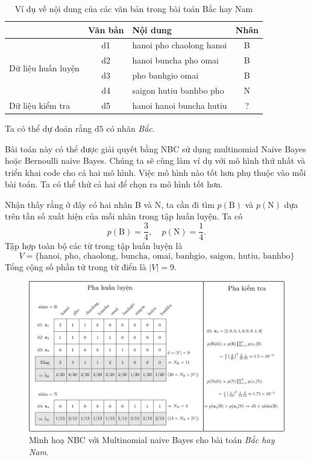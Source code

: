 \begin{table}[]
\centering
\caption{Ví dụ về nội dung của các văn bản trong bài toán Bắc hay Nam}
\label{tab:32_1}
\begin{tabular}{|l|c|l|c|}
\hline
                                & \textbf{Văn bản} & \textbf{Nội dung} & \textbf{Nhãn} \\ \hline \hline 
\multirow{4}{*}{Dữ liệu huấn luyện} & d1     & hanoi pho chaolong hanoi         & B   \\ \cline{2-4} 
                                & d2      & hanoi buncha pho omai         & B   \\ \cline{2-4} 
                                & d3      & pho banhgio omai         & B   \\ \cline{2-4} 
                                & d4      & saigon hutiu banhbo pho         & N   \\ \hline
Dữ liệu kiểm tra                        & d5      & hanoi hanoi buncha hutiu         & ?   \\ \hline
\end{tabular}
\end{table}

Ta có thể dự đoán rằng $\text{d5}$ có nhãn \textit{Bắc}.  
 
Bài toán này có thể được giải quyết bằng NBC sử dụng multinomial Naive Bayes
hoặc Bernoulli naive Bayes. Chúng ta sẽ cùng làm ví dụ với mô hình thứ nhất và
triển khai code cho cả hai mô hình. Việc mô hình nào tốt hơn phụ thuộc vào mỗi
bài toán. Ta có thể thử cả hai để chọn ra mô hình tốt hơn.
 
Nhận thấy rằng ở đây có hai nhãn B và N, ta cần đi tìm $p(\text{B})$ và $p(\text{N})$ dựa trên tần số xuất hiện của mỗi nhãn trong tập huấn luyện. Ta có
\begin{equation} 
\label{eqn:32_8}
p(\text{B}) = \frac{3}{4}, ~~~~~ p(\text{N}) = \frac{1}{4}.
\end{equation} 
Tập hợp toàn bộ các từ trong tập huấn luyện là 
$$V = \{\text{hanoi, pho, chaolong, buncha, omai, banhgio, saigon, hutiu, banhbo}\}$$ 
Tổng cộng số phần tử trong từ điển là $|V| = 9$.  
 
\begin{figure}[t]
\centering
    \includegraphics[width = \textwidth]{Chapters/03_SimpleML/32_nbc/latex/nbc.pdf}
    \caption[]{Minh hoạ NBC với Multinomial naive Bayes cho bài toán \textit{Bắc hay Nam}.}
    \label{fig:32_bn}
\end{figure}


